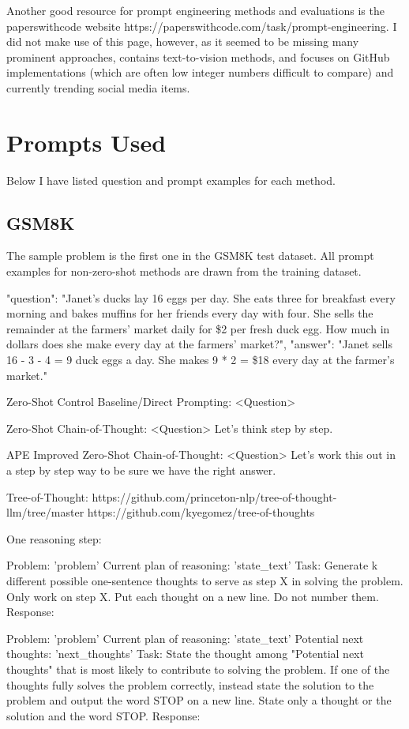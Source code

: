 \documentclass[11pt]{article}
\begin{document}
Another good resource for prompt engineering methods and evaluations is the paperswithcode website https://paperswithcode.com/task/prompt-engineering. I did not make use of this page, however, as it seemed to be missing many prominent approaches, contains text-to-vision methods, and focuses on GitHub implementations (which are often low integer numbers difficult to compare) and currently trending social media items.

\section{Prompts Used}

Below I have listed question and prompt examples for each method.
\subsection{GSM8K}

The sample problem is the first one in the GSM8K test dataset. All prompt examples for non-zero-shot methods are drawn from the training dataset.

{"question": "Janet's ducks lay 16 eggs per day. She eats three for breakfast every morning and bakes muffins for her friends every day with four. She sells the remainder at the farmers' market daily for \$2 per fresh duck egg. How much in dollars does she make every day at the farmers' market?", "answer": "Janet sells 16 - 3 - 4 = 9 duck eggs a day. She makes 9 * 2 = \$18 every day at the farmer's market."}

Zero-Shot Control Baseline/Direct Prompting:
<Question>

Zero-Shot Chain-of-Thought:
<Question>
Let's think step by step.

APE Improved Zero-Shot Chain-of-Thought:
<Question>
Let's work this out in a step by step way to be sure we have the right answer.

Tree-of-Thought: https://github.com/princeton-nlp/tree-of-thought-llm/tree/master https://github.com/kyegomez/tree-of-thoughts

One reasoning step:

Problem:
'{problem}' 
Current plan of reasoning:
'{state_text}'
Task:
Generate {k} different possible one-sentence thoughts to serve as step {X} in solving the problem. Only work on step {X}. Put each thought on a new line. Do not number them.
Response:

Problem:
'{problem}' 
Current plan of reasoning:
'{state_text}'
Potential next thoughts:
'{next_thoughts}'
Task:
State the thought among "Potential next thoughts" that is most likely to contribute to solving the problem. If one of the thoughts fully solves the problem correctly, instead state the solution to the problem and output the word STOP on a new line. State only a thought or the solution and the word STOP.
Response:
\end{document}

